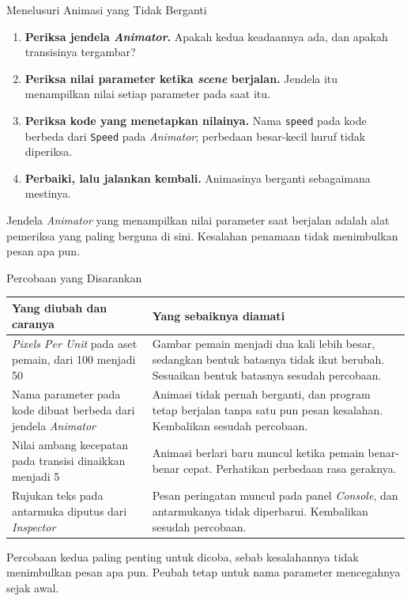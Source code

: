 \documentclass[aspectratio=169,10pt]{beamer}
\begin{document}
\begin{frame}{Menelusuri Animasi yang Tidak Berganti}
\begin{enumerate}
  \item \textbf{Periksa jendela \emph{Animator}.} Apakah kedua keadaannya ada,
        dan apakah transisinya tergambar?
  \item \textbf{Periksa nilai parameter ketika \emph{scene} berjalan.} Jendela
        itu menampilkan nilai setiap parameter pada saat itu.
  \item \textbf{Periksa kode yang menetapkan nilainya.} Nama \texttt{speed}
        pada kode berbeda dari \texttt{Speed} pada \emph{Animator}; perbedaan
        besar-kecil huruf tidak diperiksa.
  \item \textbf{Perbaiki, lalu jalankan kembali.} Animasinya berganti
        sebagaimana mestinya.
\end{enumerate}
\vspace{0.10cm}
\begin{kotak}
Jendela \emph{Animator} yang menampilkan nilai parameter saat berjalan adalah
alat pemeriksa yang paling berguna di sini. Kesalahan penamaan tidak
menimbulkan pesan apa pun.
\end{kotak}
\end{frame}

\begin{frame}{Percobaan yang Disarankan}
{\scriptsize
\renewcommand{\arraystretch}{1.12}
\begin{tabularx}{\textwidth}{@{}>{\raggedright\arraybackslash}p{6.4cm}
    >{\raggedright\arraybackslash}X@{}}
\toprule
\textbf{Yang diubah dan caranya} & \textbf{Yang sebaiknya diamati} \\
\midrule
\emph{Pixels Per Unit} pada aset pemain, dari 100 menjadi 50 &
  Gambar pemain menjadi dua kali lebih besar, sedangkan bentuk batasnya tidak
  ikut berubah. Sesuaikan bentuk batasnya sesudah percobaan. \\
\addlinespace
Nama parameter pada kode dibuat berbeda dari jendela \emph{Animator} &
  Animasi tidak pernah berganti, dan program tetap berjalan tanpa satu pun
  pesan kesalahan. Kembalikan sesudah percobaan. \\
\addlinespace
Nilai ambang kecepatan pada transisi dinaikkan menjadi 5 &
  Animasi berlari baru muncul ketika pemain benar-benar cepat. Perhatikan
  perbedaan rasa geraknya. \\
\addlinespace
Rujukan teks pada antarmuka diputus dari \emph{Inspector} &
  Pesan peringatan muncul pada panel \emph{Console}, dan antarmukanya tidak
  diperbarui. Kembalikan sesudah percobaan. \\
\bottomrule
\end{tabularx}}
\vspace{0.10cm}
\begin{peringatan}
Percobaan kedua paling penting untuk dicoba, sebab kesalahannya tidak
menimbulkan pesan apa pun. Peubah tetap untuk nama parameter mencegahnya sejak
awal.
\end{peringatan}
\end{frame}
\end{document}
